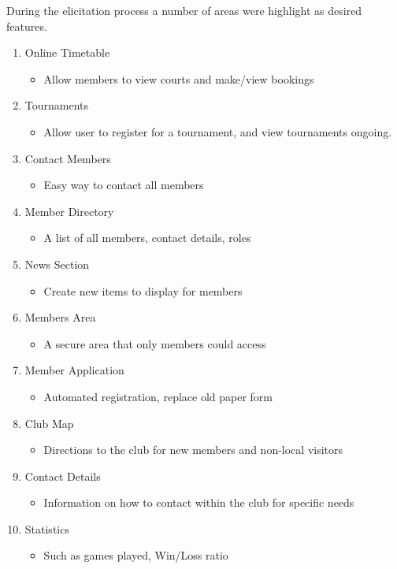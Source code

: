 During the elicitation process a number of areas were highlight as desired features.

\begin{enumerate}
\item Online Timetable
\begin{itemize}
\item Allow members to view courts and make/view bookings
\end{itemize}
\item Tournaments
\begin{itemize}
\item Allow user to register for a tournament, and view tournaments ongoing.
\end{itemize}
\item Contact Members
\begin{itemize}
\item Easy way to contact all members
\end{itemize}
\item Member Directory
\begin{itemize}
\item A list of all members, contact details, roles
\end{itemize}
\item News Section
\begin{itemize}
\item Create new items to display for members
\end{itemize}
\item Members Area
\begin{itemize}
\item A secure area that only members could access
\end{itemize}
\item Member Application
\begin{itemize}
\item Automated registration, replace old paper form
\end{itemize}
\item Club Map
\begin{itemize}
\item Directions to the club for new members and non-local visitors
\end{itemize}
\item Contact Details
\begin{itemize}
\item Information on how to contact within the club for specific needs
\end{itemize}
\item Statistics
\begin{itemize}
\item Such as games played, Win/Loss ratio
\end{itemize}
\end{enumerate}
